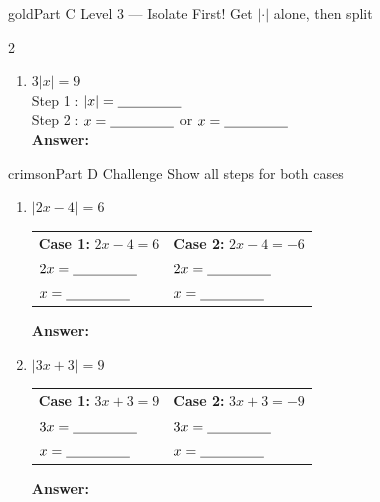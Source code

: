 \documentclass[12pt]{article}
\newcommand{\wsp}{\vspace{2.6cm}}
\newcommand{\blank}{\underline{\hspace{2.8cm}}}
\newcommand{\sblank}{\underline{\hspace{1.6cm}}}
\begin{document}
\begin{partbox}{gold}{Part C \quad Level 3 --- Isolate First!
  \hfill{\normalfont\small Get $|\cdot|$ alone, then split}}
\begin{multicols}{2}
\begin{enumerate}[label=\textbf{\arabic*.}, itemsep=0pt]
  \item $3|x| = 9$\\[3pt]
  Step \textcircled{1}: $|x| = \sblank$\\[3pt]
  Step \textcircled{2}: $x = \sblank$ or $x = \sblank$\\[3pt]
  \textbf{Answer:} \blank
  \wsp

\end{enumerate}
\end{multicols}
\end{partbox}

\vspace{12pt}

\begin{partbox}{crimson}{Part D \quad Challenge
  \hfill{\normalfont\small Show all steps for both cases}}
\vspace{6pt}
\begin{enumerate}[label=\textbf{\arabic*.}, itemsep=10pt]

  \item $|2x - 4| = 6$
  \vspace{0.4cm}

  \begin{tabular}{p{6.2cm} p{6.2cm}}
  \textbf{Case 1:} $2x - 4 = 6$ & \textbf{Case 2:} $2x - 4 = -6$ \\[6pt]
  $2x = \sblank$ & $2x = \sblank$ \\[6pt]
  $x = \sblank$ & $x = \sblank$
  \end{tabular}

  \vspace{0.3cm}
  \textbf{Answer:} \blank

  \vspace{0.5cm}
  \item $|3x + 3| = 9$
  \vspace{0.4cm}

  \begin{tabular}{p{6.2cm} p{6.2cm}}
  \textbf{Case 1:} $3x + 3 = 9$ & \textbf{Case 2:} $3x + 3 = -9$ \\[6pt]
  $3x = \sblank$ & $3x = \sblank$ \\[6pt]
  $x = \sblank$ & $x = \sblank$
  \end{tabular}

  \vspace{0.3cm}
  \textbf{Answer:} \blank


\end{enumerate}
\end{partbox}
\end{document}
